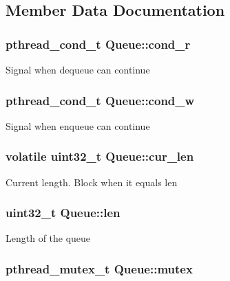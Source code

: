 \subsection{\-Member \-Data \-Documentation}
\hypertarget{structQueue_a8c115b4b7573549b7d62fa6751e51782}{
\subsubsection[{cond\-\_\-r}]{\setlength{\rightskip}{0pt plus 5cm}pthread\-\_\-cond\-\_\-t {\bf \-Queue\-::cond\-\_\-r}}}\label{structQueue_a8c115b4b7573549b7d62fa6751e51782}
\-Signal when dequeue can continue \hypertarget{structQueue_abb0db2d1ba4873469a2cd8c96421bbfe}{
\subsubsection[{cond\-\_\-w}]{\setlength{\rightskip}{0pt plus 5cm}pthread\-\_\-cond\-\_\-t {\bf \-Queue\-::cond\-\_\-w}}}\label{structQueue_abb0db2d1ba4873469a2cd8c96421bbfe}
\-Signal when enqueue can continue \hypertarget{structQueue_a7ad73de52bfdf66f2d56c0bce6fe4946}{
\subsubsection[{cur\-\_\-len}]{\setlength{\rightskip}{0pt plus 5cm}volatile uint32\-\_\-t {\bf \-Queue\-::cur\-\_\-len}}}\label{structQueue_a7ad73de52bfdf66f2d56c0bce6fe4946}
\-Current length. \-Block when it equals len \hypertarget{structQueue_abec35028ccdba58001fb1808ba239cd2}{
\subsubsection[{len}]{\setlength{\rightskip}{0pt plus 5cm}uint32\-\_\-t {\bf \-Queue\-::len}}}\label{structQueue_abec35028ccdba58001fb1808ba239cd2}
\-Length of the queue \hypertarget{structQueue_a3ea818153f3f81669955668e29a3d283}{
\subsubsection[{mutex}]{\setlength{\rightskip}{0pt plus 5cm}pthread\-\_\-mutex\-\_\-t {\bf \-Queue\-::mutex}}}\label{structQueue_a3ea818153f3f81669955668e29a3d283}
